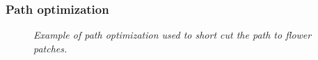 	\subsubsection{Path optimization}
		\begin{figure}\label{pathOptimization}
			\centering
			\caption{\textit{Example of path optimization used to short cut the path to flower patches.}}
		\end{figure}